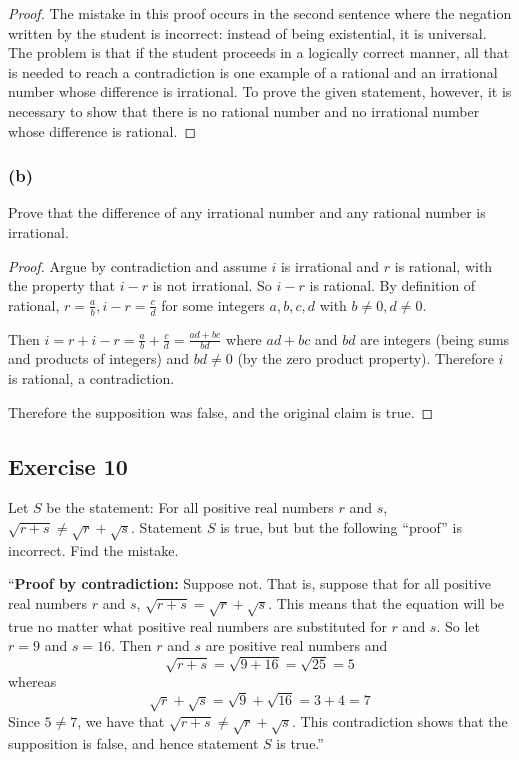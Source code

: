 \documentclass[14pt]{extarticle}
\begin{document}
\begin{proof}
    The mistake in this proof occurs in the second sentence where the negation written by the student is incorrect: instead of being existential, it is universal. The problem is that if the student proceeds in a logically correct manner, all that is needed to reach a contradiction is one example of a rational and an irrational number whose difference is irrational. To prove the given statement, however, it is necessary to show that there is no rational
    number and no irrational number whose difference is rational.
\end{proof}

\subsubsection{(b)}
Prove that the difference of any irrational number and any rational number is irrational.

\begin{proof}
    Argue by contradiction and assume $i$ is irrational and $r$ is rational, with the property that $i-r$ is not irrational. So $i-r$ is rational. By definition of rational, $r = \frac{a}{b}, i-r = \frac{c}{d}$ for some integers $a,b,c,d$ with $b \neq 0, d \neq 0$.

    Then $i = r + i - r = \frac{a}{b} + \frac{c}{d} = \frac{ad+bc}{bd}$ where $ad+bc$ and $bd$ are integers (being sums and products of integers) and $bd \neq 0$ (by the zero product property). Therefore $i$ is rational, a contradiction.

    Therefore the supposition was false, and the original claim is true.
\end{proof}

\subsection{Exercise 10}
Let $S$ be the statement: For all positive real numbers $r$ and $s$, $\sqrt{r+s} \neq \sqrt{r} + \sqrt{s}$. Statement $S$ is true, but but the following “proof” is incorrect. Find the mistake.

“{\bf Proof by contradiction:} Suppose not. That is, suppose that for all positive real numbers $r$ and $s$, $\sqrt{r + s} = \sqrt{r} + \sqrt{s}$. This means that the equation will be true no matter what positive real numbers are substituted for $r$ and $s$. So let $r = 9$ and $s = 16$. Then $r$ and $s$ are positive real numbers and
\[
    \sqrt{r+s} = \sqrt{9 + 16} = \sqrt{25} = 5
\]
whereas
\[
    \sqrt{r}+\sqrt{s} = \sqrt{9} + \sqrt{16} = 3+4 = 7
\]
Since $5 \neq 7$, we have that $\sqrt{r + s} \neq \sqrt{r} + \sqrt{s}$. This contradiction shows that the supposition is false, and hence statement $S$ is true.”
\end{document}
